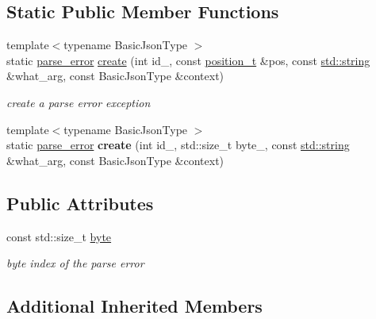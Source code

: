 \subsection*{Static Public Member Functions}
\begin{DoxyCompactItemize}
\item 
{\footnotesize template$<$typename Basic\+Json\+Type $>$ }\\static \hyperlink{classnlohmann_1_1detail_1_1parse__error}{parse\+\_\+error} \hyperlink{classnlohmann_1_1detail_1_1parse__error_ae77bd584cb9101140790219af7fec1ce}{create} (int id\+\_\+, const \hyperlink{structnlohmann_1_1detail_1_1position__t}{position\+\_\+t} \&pos, const \hyperlink{namespacenlohmann_1_1detail_a1ed8fc6239da25abcaf681d30ace4985ab45cffe084dd3d20d928bee85e7b0f21}{std\+::string} \&what\+\_\+arg, const Basic\+Json\+Type \&context)
\begin{DoxyCompactList}\small\item\em create a parse error exception \end{DoxyCompactList}\item 
\mbox{\label{classnlohmann_1_1detail_1_1parse__error_a90fbaaeeb00838e65b8d04885017ef0c}} 
{\footnotesize template$<$typename Basic\+Json\+Type $>$ }\\static \hyperlink{classnlohmann_1_1detail_1_1parse__error}{parse\+\_\+error} {\bfseries create} (int id\+\_\+, std\+::size\+\_\+t byte\+\_\+, const \hyperlink{namespacenlohmann_1_1detail_a1ed8fc6239da25abcaf681d30ace4985ab45cffe084dd3d20d928bee85e7b0f21}{std\+::string} \&what\+\_\+arg, const Basic\+Json\+Type \&context)
\end{DoxyCompactItemize}
\subsection*{Public Attributes}
\begin{DoxyCompactItemize}
\item 
const std\+::size\+\_\+t \hyperlink{classnlohmann_1_1detail_1_1parse__error_a9505aaa1ca943be927eec7cc579592ff}{byte}
\begin{DoxyCompactList}\small\item\em byte index of the parse error \end{DoxyCompactList}\end{DoxyCompactItemize}
\subsection*{Additional Inherited Members}


